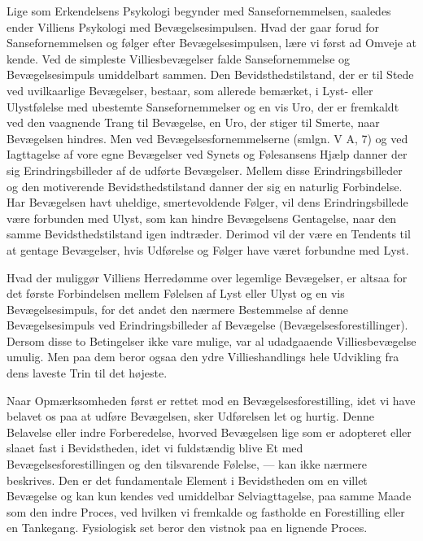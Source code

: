\documentclass[12pt,a4paper,openany]{book}
\newcommand{\opage}[1]{\marginnote{\footnotesize\textit{[#1]}}}
\begin{document}
Lige som Erkendelsens Psykologi begynder med Sansefornemmelsen, saaledes
ender Villiens Psykologi med Bevægelsesimpulsen. Hvad der gaar forud for
Sansefornemmelsen og følger efter Bevægelsesimpulsen, lære vi først ad
Omveje at kende. Ved de simpleste Villiesbevægelser falde
Sansefornemmelse og Bevægelsesimpuls umiddelbart sammen. Den
Bevidsthedstilstand, der er til Stede ved uvilkaarlige Bevægelser,
bestaar, som allerede bemærket, i Lyst- eller Ulystfølelse med ubestemte
Sansefornemmelser og en vis Uro, der er fremkaldt ved den vaagnende
Trang til Bevægelse, en Uro, der stiger til Smerte, naar Bevægelsen
hindres. Men ved Bevægelsesfornemmelserne (smlgn. V A, 7) og ved
Iagttagelse af vore egne Bevægelser ved Synets og Følesansens Hjælp
danner der sig Erindringsbilleder af de udførte Bevægelser. Mellem disse
\opage{376}Erindringsbilleder og den motiverende Bevidsthedstilstand
danner der sig en naturlig Forbindelse. Har Bevægelsen havt uheldige,
smertevoldende Følger, vil dens Erindringsbillede være forbunden med
Ulyst, som kan hindre Bevægelsens Gentagelse, naar den samme
Bevidsthedstilstand igen indtræder. Derimod vil der være en Tendents til
at gentage Bevægelser, hvis Udførelse og Følger have været forbundne med
Lyst.

Hvad der muliggør Villiens Herredømme over legemlige Bevægelser, er
altsaa for det første Forbindelsen mellem Følelsen af Lyst eller Ulyst
og en vis Bevægelsesimpuls, for det andet den nærmere Bestemmelse af
denne Bevægelsesimpuls ved Erindringsbilleder af Bevægelse
(Bevægelsesforestillinger). Dersom disse to Betingelser ikke vare
mulige, var al udadgaaende Villiesbevægelse umulig. Men paa dem beror
ogsaa den ydre Villieshandlings hele Udvikling fra dens laveste Trin til
det højeste.

Naar Opmærksomheden først er rettet mod en Bevægelsesforestilling, idet
vi have belavet os paa at udføre Bevægelsen, sker Udførelsen let og
hurtig. Denne Belavelse eller indre Forberedelse, hvorved Bevægelsen
lige som er adopteret eller slaaet fast i Bevidstheden, idet vi
fuldstændig blive Et med Bevægelsesforestillingen og den tilsvarende
Følelse, --- kan ikke nærmere beskrives. Den er det fundamentale Element
i Bevidstheden om en villet Bevægelse og kan kun kendes ved umiddelbar
Selviagttagelse, paa samme Maade som den indre Proces, ved hvilken vi
fremkalde og fastholde en Forestilling eller en Tankegang. Fysiologisk
set beror den vistnok paa en lignende Proces.
\end{document}
